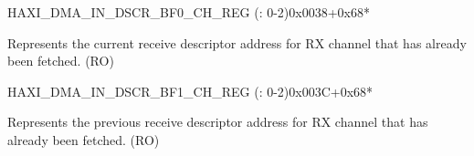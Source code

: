 \begin{register}{H}{AXI\_DMA\_IN\_DSCR\_BF0\_CH\_REG (: 0-2)}{0x0038+0x68*}\label{regdesc:AXIDMAINDSCRBF0CHNREG}
%
\regnewline%
\begin{regdesc}\begin{reglist}
\label{fielddesc:AXIDMAINLINKDSCRBF0CHN}\item [AXI\_DMA\_INLINK\_DSCR\_BF0\_CH\regindex{n}] Represents the current receive descriptor address for RX channel  that has already been fetched. (RO)
\end{reglist}\end{regdesc}
\end{register}


\begin{register}{H}{AXI\_DMA\_IN\_DSCR\_BF1\_CH\_REG (: 0-2)}{0x003C+0x68*}\label{regdesc:AXIDMAINDSCRBF1CHNREG}
%
\regnewline%
\begin{regdesc}\begin{reglist}
\label{fielddesc:AXIDMAINLINKDSCRBF1CHN}\item [AXI\_DMA\_INLINK\_DSCR\_BF1\_CH\regindex{n}] Represents the previous receive descriptor address for RX channel  that has already been fetched. (RO)
\end{reglist}\end{regdesc}
\end{register}


